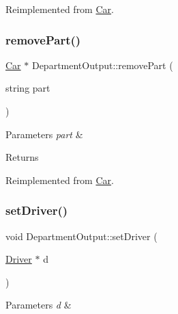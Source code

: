 Reimplemented from \hyperlink{classCar}{Car}.

\mbox{\label{classDepartmentOutput_a8bd91d321113668938ecb8fb549d972c}} 
\subsubsection{\texorpdfstring{remove\+Part()}{removePart()}}
{\footnotesize\ttfamily \hyperlink{classCar}{Car} $\ast$ Department\+Output\+::remove\+Part (\begin{DoxyParamCaption}\item[{string}]{part }\end{DoxyParamCaption})\hspace{0.3cm}{\ttfamily [virtual]}}


\begin{DoxyParams}{Parameters}
{\em part} & \\
\hline
\end{DoxyParams}
\begin{DoxyReturn}{Returns}

\end{DoxyReturn}


Reimplemented from \hyperlink{classCar_a54018ac7e84e79c8bfc1a8fba5e45b16}{Car}.

\mbox{\label{classDepartmentOutput_aa045362e5763d57a2c888b98c677773c}} 
\subsubsection{\texorpdfstring{set\+Driver()}{setDriver()}}
{\footnotesize\ttfamily void Department\+Output\+::set\+Driver (\begin{DoxyParamCaption}\item[{\hyperlink{classDriver}{Driver} $\ast$}]{d }\end{DoxyParamCaption})\hspace{0.3cm}{\ttfamily [virtual]}}


\begin{DoxyParams}{Parameters}
{\em d} & \\
\hline
\end{DoxyParams}


